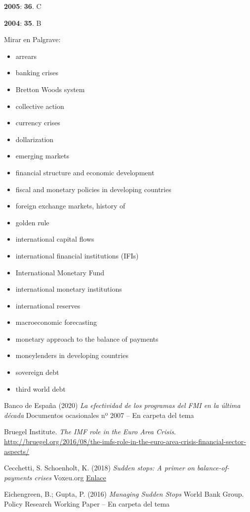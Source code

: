 \documentclass{nuevotema}
\begin{document}
\textbf{2005}: \textbf{36}. C

\textbf{2004}: \textbf{35}. B

\bibliografia

Mirar en Palgrave:
\begin{itemize}
    \item arrears
    \item banking crises
    \item Bretton Woods system
    \item collective action
    \item currency crises
    \item dollarization
    \item emerging markets
    \item financial structure and economic development
    \item fiscal and monetary policies in developing countries
    \item foreign exchange markets, history of
    \item golden rule
    \item international capital flows
    \item international financial institutions (IFIs)
    \item International Monetary Fund
    \item international monetary institutions
    \item international reserves
    \item macroeconomic forecasting
    \item monetary approach to the balance of payments
    \item moneylenders in developing countries
    \item sovereign debt
    \item third world debt
\end{itemize}

Banco de España (2020) \textit{La efectividad de los programas del FMI en la última década} Documentos ocasionales nº 2007 -- En carpeta del tema

Bruegel Institute. \textit{The IMF role in the Euro Area Crisis}.  \url{ http://bruegel.org/2016/08/the-imfs-role-in-the-euro-area-crisis-financial-sector-aspects/}

Cecchetti, S. Schoenholt, K. (2018) \textit{Sudden stops: A primer on balance-of-payments crises} Voxeu.org \href{https://voxeu.org/content/sudden-stops-primer-balance-payments-crises}{Enlace}

Eichengreen, B.; Gupta, P. (2016) \textit{Managing Sudden Stops} World Bank Group. Policy Research Working Paper -- En carpeta del tema
\end{document}
